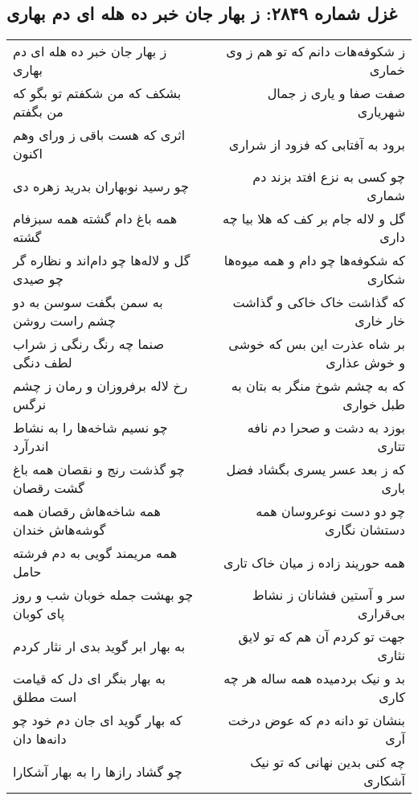 \begin{center}
\section*{غزل شماره ۲۸۴۹: ز بهار جان خبر ده هله ای دم بهاری}
\label{sec:2849}
\begin{longtable}{l p{0.5cm} r}
ز بهار جان خبر ده هله ای دم بهاری
&&
ز شکوفه‌هات دانم که تو هم ز وی خماری
\\
بشکف که من شکفتم تو بگو که من بگفتم
&&
صفت صفا و یاری ز جمال شهریاری
\\
اثری که هست باقی ز ورای وهم اکنون
&&
برود به آفتابی که فزود از شراری
\\
چو رسید نوبهاران بدرید زهره دی
&&
چو کسی به نزع افتد بزند دم شماری
\\
همه باغ دام گشته همه سبزفام گشته
&&
گل و لاله جام بر کف که هلا بیا چه داری
\\
گل و لاله‌ها چو دام‌اند و نظاره گر چو صیدی
&&
که شکوفه‌ها چو دام و همه میوه‌ها شکاری
\\
به سمن بگفت سوسن به دو چشم راست روشن
&&
که گذاشت خاک خاکی و گذاشت خار خاری
\\
صنما چه رنگ رنگی ز شراب لطف دنگی
&&
بر شاه عذرت این بس که خوشی و خوش عذاری
\\
رخ لاله برفروزان و رمان ز چشم نرگس
&&
که به چشم شوخ منگر به بتان به طبل خواری
\\
چو نسیم شاخه‌ها را به نشاط اندرآرد
&&
بوزد به دشت و صحرا دم نافه تتاری
\\
چو گذشت رنج و نقصان همه باغ گشت رقصان
&&
که ز بعد عسر یسری بگشاد فضل باری
\\
همه شاخه‌هاش رقصان همه گوشه‌هاش خندان
&&
چو دو دست نوعروسان همه دستشان نگاری
\\
همه مریمند گویی به دم فرشته حامل
&&
همه حوریند زاده ز میان خاک تاری
\\
چو بهشت جمله خوبان شب و روز پای کوبان
&&
سر و آستین فشانان ز نشاط بی‌قراری
\\
به بهار ابر گوید بدی ار نثار کردم
&&
جهت تو کردم آن هم که تو لایق نثاری
\\
به بهار بنگر ای دل که قیامت است مطلق
&&
بد و نیک بردمیده همه ساله هر چه کاری
\\
که بهار گوید ای جان دم خود چو دانه‌ها دان
&&
بنشان تو دانه دم که عوض درخت آری
\\
چو گشاد رازها را به بهار آشکارا
&&
چه کنی بدین نهانی که تو نیک آشکاری
\\
\end{longtable}
\end{center}
